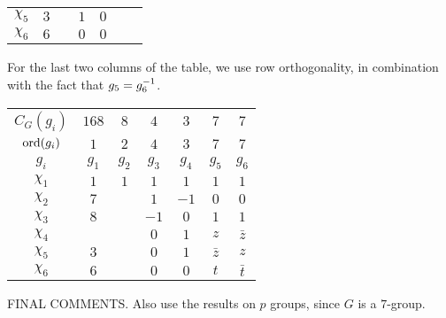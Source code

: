 \begin{boxexample}[Constructing the Character Table of $G = \PSL{2, 7}$]
\begin{table}[H]
\begin{subtable}{0.45\linewidth}
\begin{tabular}{|c|cccccc|}
                $\chi_5$ & $3$ & & $1$ & $0$ & & \\
                $\chi_6$ & $6$ & & $0$ & $0$ & & \\
            \end{tabular}
        \end{subtable}
    \end{table}
    For the last two columns of the table, we use row orthogonality, in combination with the fact that $g_5 = g_6^{-1}$.
    \begin{table}[H]
        \centering
        \begin{tabular}{|c|cccccc|}
            $C_G(g_i)$ & $168$ & $8$ & $4$ & $3$ & $7$ & $7$ \\
            $\operatorname{ord}\!\left( g_i \right)$ & $1$ & $2$ & $4$ & $3$ & $7$ & $7$ \\
            $g_i$ & $g_1$ & $g_2$ & $g_3$ & $g_4$ & $g_5$ & $g_6$ \\
            \hline
            $\chi_1$ & $1$ & $1$ & $1$ & $1$ & $1$ & $1$ \\
            $\chi_2$ & $7$ & & $1$ & $-1$ & $0$ & $0$ \\
            $\chi_3$ & $8$ & & $-1$ & $0$ & $1$ & $1$ \\
            $\chi_4$ & & & $0$ & $1$ & $z$ & $\bar{z}$ \\
            $\chi_5$ & $3$ & & $0$ & $1$ & $\bar{z}$ & $z$ \\
            $\chi_6$ & $6$ & & $0$ & $0$ & $t$ & $\bar{t}$ \\
        \end{tabular}
    \end{table}

    FINAL COMMENTS. Also use the results on $p$ groups, since $G$ is a $7$-group.
\end{boxexample}
